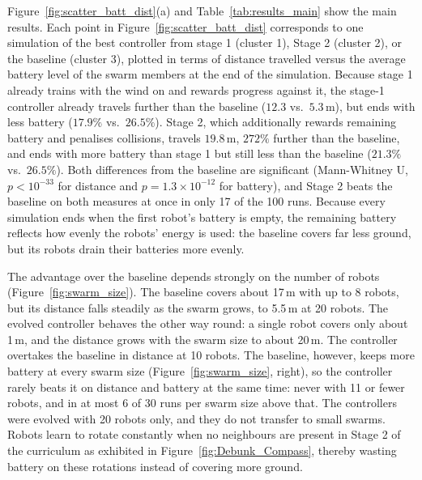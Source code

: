 \documentclass[runningheads]{llncs}
\begin{document}
Figure~\ref{fig:scatter_batt_dist}(a) and Table~\ref{tab:results_main} show the main results. Each point in Figure~\ref{fig:scatter_batt_dist} corresponds to one simulation of the best controller from stage 1 (cluster 1), Stage 2 (cluster 2), or the baseline (cluster 3), plotted in terms of distance travelled versus the average battery level of the swarm members at the end of the simulation. Because stage 1 already trains with the wind on and rewards progress against it, the stage-1 controller already travels further than the baseline ($12.3$ vs.\ $5.3$\,m), but ends with less battery ($17.9\%$ vs.\ $26.5\%$). Stage 2, which additionally rewards remaining battery and penalises collisions, travels $19.8$\,m, $272\%$ further than the baseline, and ends with more battery than stage 1 but still less than the baseline ($21.3\%$ vs.\ $26.5\%$). Both differences from the baseline are significant (Mann-Whitney U, $p < 10^{-33}$ for distance and $p = 1.3\times10^{-12}$ for battery), and Stage 2 beats the baseline on both measures at once in only 17 of the 100 runs. Because every simulation ends when the first robot's battery is empty, the remaining battery reflects how evenly the robots' energy is used: the baseline covers far less ground, but its robots drain their batteries more evenly.

The advantage over the baseline depends strongly on the number of robots (Figure~\ref{fig:swarm_size}). The baseline covers about 17\,m with up to 8 robots, but its distance falls steadily as the swarm grows, to 5.5\,m at 20 robots. The evolved controller behaves the other way round: a single robot covers only about 1\,m, and the distance grows with the swarm size to about 20\,m. The controller overtakes the baseline in distance at 10 robots. The baseline, however, keeps more battery at every swarm size (Figure~\ref{fig:swarm_size}, right), so the controller rarely beats it on distance and battery at the same time: never with 11 or fewer robots, and in at most 6 of 30 runs per swarm size above that. The controllers were evolved with 20 robots only, and they do not transfer to small swarms. Robots learn to rotate constantly when no neighbours are present in Stage 2 of the curriculum as exhibited in Figure~\ref{fig:Debunk_Compass}, thereby wasting battery on these rotations instead of covering more ground.
\end{document}
